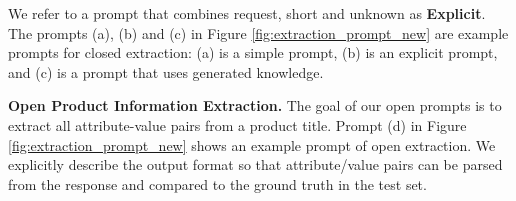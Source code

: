 We refer to a prompt that combines request, short and unknown as \textbf{Explicit}. The prompts (a), (b) and (c) in Figure \ref{fig:extraction_prompt_new} are example prompts for closed extraction: (a) is a simple prompt, (b) is an explicit prompt, %
and (c) is a prompt that uses generated knowledge.




\vspace{.2cm}\noindent\textbf{Open Product Information Extraction.}
The goal of our open prompts is to extract all attribute-value pairs from a product title. 
Prompt (d) in Figure \ref{fig:extraction_prompt_new} shows an example prompt of open extraction. We explicitly describe the output format so that  attribute/value pairs can be parsed from the response and compared to the ground truth in the test set.

